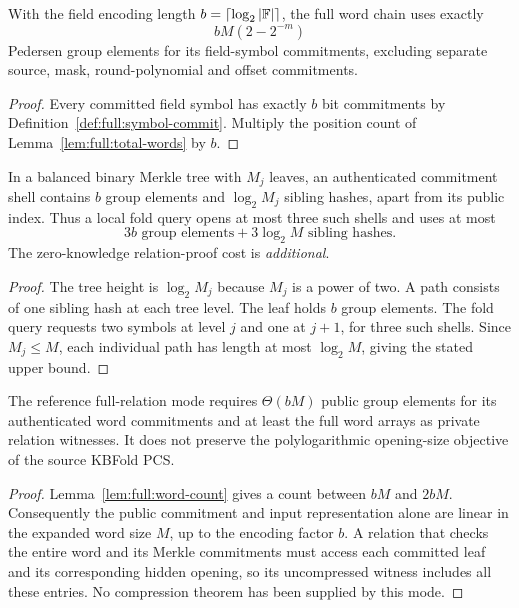 \begin{lemma}\label{lem:full:word-count}
With the field encoding length
$b=\lceil\log_2|\mathbb{F}|\rceil$,
the full word chain uses
exactly
\[
 \boxed{bM(2-2^{-m})}
\]
Pedersen group elements for
its field-symbol commitments,
excluding separate source,
mask, round-polynomial and
offset commitments.
\end{lemma}
\begin{proof}
Every committed field symbol
has exactly $b$ bit commitments
by Definition~\ref{def:full:symbol-commit}.
Multiply the position count of
Lemma~\ref{lem:full:total-words}
by $b$.
\end{proof}

\begin{lemma}\label{lem:full:query-cost}
In a balanced binary Merkle tree
with $M_j$ leaves, an
authenticated commitment shell
contains $b$ group elements
and $\log_2 M_j$ sibling hashes,
apart from its public index.
Thus a local fold query
opens at most three such shells
and uses at most
\[
 \boxed{3b\text{ group elements}
       +3\log_2M\text{ sibling hashes}.}
\]
The zero-knowledge relation-proof
cost is \emph{additional}.
\end{lemma}
\begin{proof}
The tree height is
$\log_2M_j$ because $M_j$
is a power of two.
A path consists of one sibling
hash at each tree level.
The leaf holds $b$ group
elements. The fold query
requests two symbols at
level $j$ and one at $j+1$,
for three such shells.
Since $M_j\le M$, each
individual path has length
at most $\log_2M$, giving
the stated upper bound.
\end{proof}

\begin{proposition}\label{prop:full:not-succinct}
The reference full-relation
mode requires $\Theta(bM)$
public group elements for
its authenticated word
commitments and at least
the full word arrays as
private relation witnesses.
It does not preserve the
polylogarithmic opening-size
objective of the source
KBFold PCS.
\end{proposition}
\begin{proof}
Lemma~\ref{lem:full:word-count}
gives a count between
$bM$ and $2bM$.
Consequently the public
commitment and input
representation alone are
linear in the expanded
word size $M$, up to
the encoding factor $b$.
A relation that checks the
entire word and its
Merkle commitments must
access each committed
leaf and its corresponding
hidden opening, so its
uncompressed witness
includes all these entries.
No compression theorem has
been supplied by this mode.
\end{proof}


